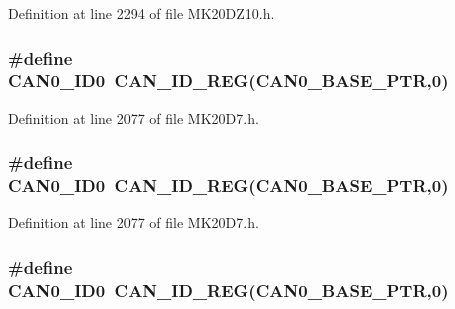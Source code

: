 Definition at line 2294 of file M\+K20\+D\+Z10.\+h.

\subsubsection[{\texorpdfstring{C\+A\+N0\+\_\+\+I\+D0}{CAN0_ID0}}]{\setlength{\rightskip}{0pt plus 5cm}\#define C\+A\+N0\+\_\+\+I\+D0~{\bf C\+A\+N\+\_\+\+I\+D\+\_\+\+R\+EG}({\bf C\+A\+N0\+\_\+\+B\+A\+S\+E\+\_\+\+P\+TR},0)}\hypertarget{group___c_a_n___register___accessor___macros_ga678e724a1b0ab81bad65aa85d4e55782}{}\label{group___c_a_n___register___accessor___macros_ga678e724a1b0ab81bad65aa85d4e55782}


Definition at line 2077 of file M\+K20\+D7.\+h.

\subsubsection[{\texorpdfstring{C\+A\+N0\+\_\+\+I\+D0}{CAN0_ID0}}]{\setlength{\rightskip}{0pt plus 5cm}\#define C\+A\+N0\+\_\+\+I\+D0~{\bf C\+A\+N\+\_\+\+I\+D\+\_\+\+R\+EG}({\bf C\+A\+N0\+\_\+\+B\+A\+S\+E\+\_\+\+P\+TR},0)}\hypertarget{group___c_a_n___register___accessor___macros_ga678e724a1b0ab81bad65aa85d4e55782}{}\label{group___c_a_n___register___accessor___macros_ga678e724a1b0ab81bad65aa85d4e55782}


Definition at line 2077 of file M\+K20\+D7.\+h.

\subsubsection[{\texorpdfstring{C\+A\+N0\+\_\+\+I\+D0}{CAN0_ID0}}]{\setlength{\rightskip}{0pt plus 5cm}\#define C\+A\+N0\+\_\+\+I\+D0~{\bf C\+A\+N\+\_\+\+I\+D\+\_\+\+R\+EG}({\bf C\+A\+N0\+\_\+\+B\+A\+S\+E\+\_\+\+P\+TR},0)}\hypertarget{group___c_a_n___register___accessor___macros_ga678e724a1b0ab81bad65aa85d4e55782}{}\label{group___c_a_n___register___accessor___macros_ga678e724a1b0ab81bad65aa85d4e55782}


